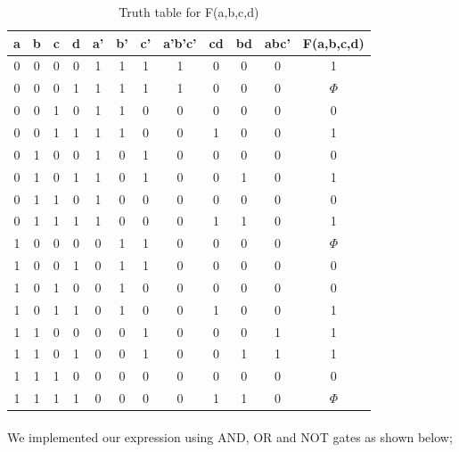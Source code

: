 \documentclass[pdftex,12pt,a4paper]{article}
\begin{document}
\begin{table}[h]
\centering
\begin{tabular}{|c|c|c|c|c|c|c|c|c|c|c|c|}
\hline
a & b & c & d & a' & b' & c' & a'b'c' & cd & bd & abc' & F(a,b,c,d) \\ \hline
0 & 0 & 0 & 0 & 1  & 1  & 1  & 1      & 0  & 0  & 0    & 1          \\ 
0 & 0 & 0 & 1 & 1  & 1  & 1  & 1      & 0  & 0  & 0    & ${\Phi}$          \\ 
0 & 0 & 1 & 0 & 1  & 1  & 0  & 0      & 0  & 0  & 0    & 0          \\ 
0 & 0 & 1 & 1 & 1  & 1  & 0  & 0      & 1  & 0  & 0    & 1          \\ 
0 & 1 & 0 & 0 & 1  & 0  & 1  & 0      & 0  & 0  & 0    & 0          \\ 
0 & 1 & 0 & 1 & 1  & 0  & 1  & 0      & 0  & 1  & 0    & 1          \\
0 & 1 & 1 & 0 & 1  & 0  & 0  & 0      & 0  & 0  & 0    & 0          \\ 
0 & 1 & 1 & 1 & 1  & 0  & 0  & 0      & 1  & 1  & 0    & 1          \\ 
1 & 0 & 0 & 0 & 0  & 1  & 1  & 0      & 0  & 0  & 0    & ${\Phi}$          \\ 
1 & 0 & 0 & 1 & 0  & 1  & 1  & 0      & 0  & 0  & 0    & 0          \\ 
1 & 0 & 1 & 0 & 0  & 1  & 0  & 0      & 0  & 0  & 0    & 0          \\ 
1 & 0 & 1 & 1 & 0  & 1  & 0  & 0      & 1  & 0  & 0    & 1          \\ 
1 & 1 & 0 & 0 & 0  & 0  & 1  & 0      & 0  & 0  & 1    & 1          \\ 
1 & 1 & 0 & 1 & 0  & 0  & 1  & 0      & 0  & 1  & 1    & 1          \\
1 & 1 & 1 & 0 & 0  & 0  & 0  & 0      & 0  & 0  & 0    & 0          \\ 
1 & 1 & 1 & 1 & 0  & 0  & 0  & 0      & 1  & 1  & 0    & ${\Phi}$          \\ \hline
\end{tabular}
\caption{Truth table for F(a,b,c,d)}
\label{truth1}
\end{table}

\clearpage


\paragraph{}
We implemented our expression using AND, OR and NOT gates as shown below;
\end{document}
